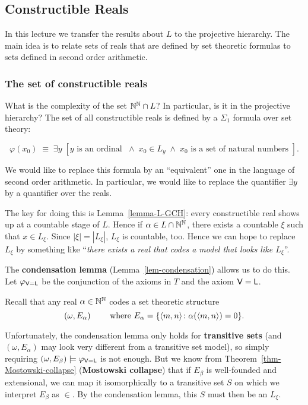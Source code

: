 \subsection{Constructible Reals}

In this lecture we transfer the results about $L$ to the projective hierarchy. The main idea is to relate sets of reals that are defined by set theoretic formulas to sets defined in second order arithmetic.

\subsubsection{The set of constructible reals}

What is the complexity of the set $\mathbb{N}^{\mathbb{N}} \cap L$? In particular, is it in the projective hierarchy?
The set of all constructible reals is defined by a $\Sigma_1$ formula over set theory:

\begin{equation}
\varphi(x_0)	\; \equiv \; \exists y \; [y \text{ is an ordinal }  \; \wedge \; x_0 \in L_y \; \wedge \; x_0 \text{ is a set of natural numbers }  ].
\end{equation}

We would like to replace this formula by an ``equivalent'' one in the language of second order arithmetic. In particular, we would like to replace the quantifier $\exists y$ by a quantifier over the reals.

The key for doing this is Lemma~\ref{lemma-L-GCH}: every constructible real shows up at a countable stage of $L$. Hence if $\alpha \in L \cap \mathbb{N}^{\mathbb{N}}$, there exists a countable $\xi$ such that $x \in L_\xi$. Since $|\xi| = |L_\xi|$, $L_\xi$ is countable, too. Hence we can hope to replace $L_\xi$ by something like ``\textit{there exists a real that codes a model that looks like $L_\xi$}''.

The \textbf{condensation lemma} (Lemma~\ref{lem-condensation}) allows us to do this.
Let $\varphi_{\mathsf{V=L}}$ be the conjunction of the axioms in $T$ and the axiom $\mathsf{V=L}$.

Recall that any real $\alpha \in \mathbb{N}^{\mathbb{N}}$ codes a set theoretic structure
\begin{equation*}
(\omega, E_\alpha) \qquad \text{ where } E_\alpha = \{ \langle m,n \rangle \colon \alpha(\langle m,n \rangle) =  0 \}.
\end{equation*}

Unfortunately, the condensation lemma only holds for \textbf{transitive sets} (and $(\omega, E_\alpha)$ may look very different from a transitive set model), so simply requiring $(\omega,E_\beta) \models \varphi_{\mathsf{V=L}}$ is not enough. But we know from Theorem~\ref{thm-Mostowski-collapse} (\textbf{Mostowski collapse}) that if $E_\beta$ is well-founded and extensional, we can map it isomorphically to a transitive set $S$ on which we interpret $E_\beta$ as $\in$. By the condensation lemma, this $S$ must then be an $L_\xi$.

